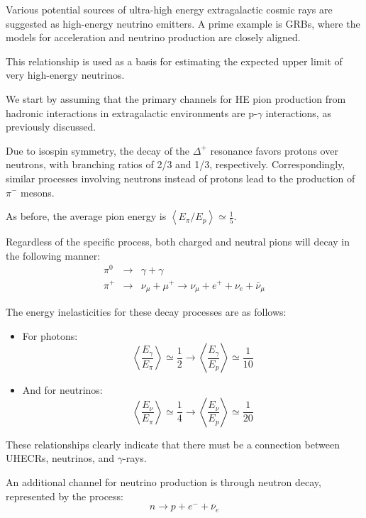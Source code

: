 Various potential sources of ultra-high energy extragalactic cosmic rays are suggested as high-energy neutrino emitters. A prime example is GRBs, where the models for acceleration and neutrino production are closely aligned.

This relationship is used as a basis for estimating the expected upper limit of very high-energy neutrinos.


We start by assuming that the primary channels for HE pion production from hadronic interactions in extragalactic environments are p-$\gamma$ interactions, as previously discussed.

Due to isospin symmetry, the decay of the $\Delta^+$ resonance favors protons over neutrons, with branching ratios of 2/3 and 1/3, respectively. Correspondingly, similar processes involving neutrons instead of protons lead to the production of $\pi^-$ mesons.

As before, the average pion energy is \( \left\langle {E_\pi}/{E_p} \right\rangle \simeq \frac{1}{5} \).

Regardless of the specific process, both charged and neutral pions will decay in the following manner:
%
\begin{eqnarray*}
\pi^0 &\rightarrow& \gamma + \gamma \\
\pi^+ &\rightarrow& \nu_\mu + \mu^+ \rightarrow \nu_\mu + e^+ + \nu_e + \bar\nu_\mu 
\end{eqnarray*}

The energy inelasticities for these decay processes are as follows:
%
\begin{itemize}
\item For photons:
\[
\left\langle \frac{E_\gamma}{E_\pi} \right\rangle \simeq \frac{1}{2} \rightarrow \left\langle \frac{E_\gamma}{E_p} \right\rangle \simeq \frac{1}{10}
\]

\item And for neutrinos:
\[
\left\langle \frac{E_\nu}{E_\pi} \right\rangle \simeq \frac{1}{4} \rightarrow \left\langle \frac{E_\nu}{E_p} \right\rangle \simeq \frac{1}{20}
\]
\end{itemize}

These relationships clearly indicate that there must be a connection between UHECRs, neutrinos, and $\gamma$-rays.

An additional channel for neutrino production is through neutron decay, represented by the process:
%
\[
n \rightarrow p + e^- + \bar\nu_e
\]

